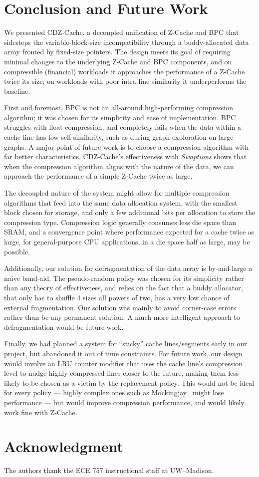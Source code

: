 \documentclass[conference]{IEEEtran}
\begin{document}
\section{Conclusion and Future Work}
We presented CDZ-Cache, a decoupled unification of Z-Cache and BPC that
sidesteps the variable-block-size incompatibility through a buddy-allocated
data array fronted by fixed-size pointers. The design meets its goal of
requiring minimal changes to the underlying Z-Cache and BPC components, and on
compressible (financial) workloads it approaches the performance of a
Z-Cache twice its size; on workloads with poor intra-line similarity it
underperforms the baseline.

First and foremost, BPC is not an all-around high-performing compression
algorithm; it was chosen for its simplicity and ease of implementation. BPC
struggles with float compression, and completely fails when the data within a
cache line has low self-similarity, such as during graph exploration on large
graphs. A major point of future work is to choose a compression algorithm with
far better characteristics. CDZ-Cache's effectiveness with \textit{Swaptions}
shows that when the compression algorithm aligns with the nature of the data,
we can approach the performance of a simple Z-Cache twice as large.

The decoupled nature of the system might allow for multiple compression
algorithms that feed into the same data allocation system, with the smallest
block chosen for storage, and only a few additional bits per allocation to
store the compression type. Compression logic generally consumes less die space
than SRAM, and a convergence point where performance expected for a cache twice
as large, for general-purpose CPU applications, in a die space half as large,
may be possible.

Additionally, our solution for defragmentation of the data array is by-and-large
a naive band-aid. The pseudo-random policy was chosen for its simplicity rather
than any theory of effectiveness, and relies on the fact that a buddy
allocator, that only has to shuffle 4 sizes all powers of two, has a very low
chance of external fragmentation. Our solution was mainly to avoid corner-case
errors rather than be any permanent solution. A much more intelligent approach
to defragmentation would be future work.

Finally, we had planned a system for ``sticky'' cache lines/segments early in
our project, but abandoned it out of time constraints. For future work, our
design would involve an LRU counter modifier that uses the cache line's
compression level to nudge highly compressed lines closer to the future, making
them less likely to be chosen as a victim by the replacement policy. This would
not be ideal for every policy --- highly complex ones such as
Mockingjay~\cite{shah2022mockingjay} might lose performance --- but would
improve compression performance, and would likely work fine with Z-Cache.

\section*{Acknowledgment}
The authors thank the ECE 757 instructional staff at UW--Madison.



\end{document}
